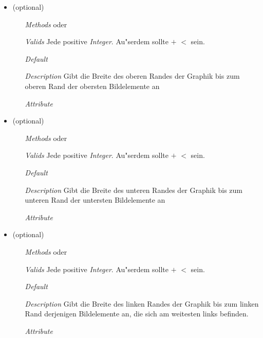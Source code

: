 \begin{description}
\begin{itemize}
\item {} (optional)
\begin{enumerate}
\item[\textit{Methods}] 
  oder 
\item[\textit{Valids}] Jede positive \textit{Integer}. Au"serdem
  sollte  $+$  $<$
   sein.
\item[\textit{Default}] 
\item[\textit{Description}] Gibt die Breite des oberen Randes der
  Graphik bis zum oberen Rand der obersten Bildelemente an
\item[\textit{Attribute}] 
\end{enumerate}

\item {} (optional)
\begin{enumerate}
\item[\textit{Methods}] 
  oder 
\item[\textit{Valids}] Jede positive \textit{Integer}. Au"serdem
  sollte  $+$  $<$
   sein.
\item[\textit{Default}] 
\item[\textit{Description}] Gibt die Breite des unteren Randes der
  Graphik bis zum unteren Rand der untersten Bildelemente an
\item[\textit{Attribute}] 
\end{enumerate}

\item {} (optional)
\begin{enumerate}
\item[\textit{Methods}] 
  oder 
\item[\textit{Valids}] Jede positive \textit{Integer}. Au"serdem
  sollte  $+$  $<$
   sein.
\item[\textit{Default}] 
\item[\textit{Description}] Gibt die Breite des linken Randes der
  Graphik bis zum linken Rand derjenigen Bildelemente an, die sich am
  weitesten links befinden.
\item[\textit{Attribute}] 
\end{enumerate}


\end{itemize}
\end{description}
